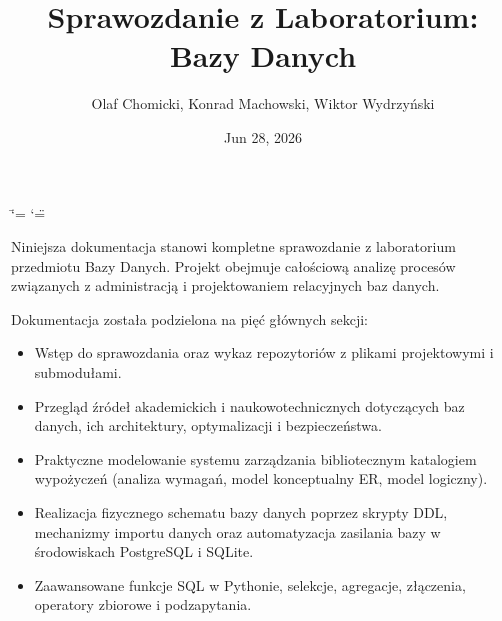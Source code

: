 \documentclass[a4paper,11pt,english,openany,oneside]{sphinxmanual}
\title{Sprawozdanie z Laboratorium: Bazy Danych}
\date{Jun 28, 2026}
\author{Olaf Chomicki, Konrad Machowski, Wiktor Wydrzyński}
\begin{document}
\ifdefined\shorthandoff
  \ifnum\catcode`\=\string=\active\shorthandoff{=}\fi
  \ifnum\catcode`\"=\active{}\fi
\fi

\pagestyle{empty}
\sphinxmaketitle
\pagestyle{plain}
\sphinxtableofcontents
\pagestyle{normal}
\label{\detokenize{index::doc}}


\sphinxAtStartPar
Niniejsza dokumentacja stanowi kompletne sprawozdanie z laboratorium przedmiotu Bazy Danych. Projekt obejmuje całościową analizę procesów związanych z administracją i projektowaniem relacyjnych baz danych.

\sphinxAtStartPar
Dokumentacja została podzielona na pięć głównych sekcji:
\begin{itemize}
\item {} 
\sphinxAtStartPar
{} Wstęp do sprawozdania oraz wykaz repozytoriów z plikami projektowymi i submodułami.

\item {} 
\sphinxAtStartPar
{} Przegląd źródeł akademickich i naukowo\sphinxhyphen{}technicznych dotyczących baz danych, ich architektury, optymalizacji i bezpieczeństwa.

\item {} 
\sphinxAtStartPar
{} Praktyczne modelowanie systemu zarządzania bibliotecznym katalogiem wypożyczeń (analiza wymagań, model konceptualny E\sphinxhyphen{}R, model logiczny).

\item {} 
\sphinxAtStartPar
{} Realizacja fizycznego schematu bazy danych poprzez skrypty DDL, mechanizmy importu danych oraz automatyzacja zasilania bazy w środowiskach PostgreSQL i SQLite.

\item {} 
\sphinxAtStartPar
{} Zaawansowane funkcje SQL w Pythonie, selekcje, agregacje, złączenia, operatory zbiorowe i podzapytania.

\end{itemize}

\sphinxstepscope
\end{document}
